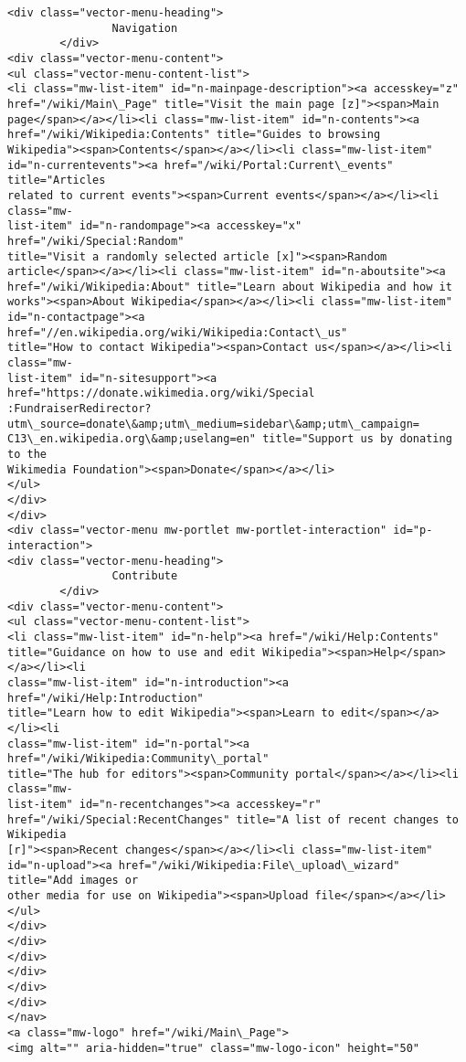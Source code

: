 \documentclass[11pt]{article}
\begin{document}
\begin{Verbatim}[commandchars=\\\{\}]
<div class="vector-menu-heading">
                Navigation
        </div>
<div class="vector-menu-content">
<ul class="vector-menu-content-list">
<li class="mw-list-item" id="n-mainpage-description"><a accesskey="z"
href="/wiki/Main\_Page" title="Visit the main page [z]"><span>Main
page</span></a></li><li class="mw-list-item" id="n-contents"><a
href="/wiki/Wikipedia:Contents" title="Guides to browsing
Wikipedia"><span>Contents</span></a></li><li class="mw-list-item"
id="n-currentevents"><a href="/wiki/Portal:Current\_events" title="Articles
related to current events"><span>Current events</span></a></li><li class="mw-
list-item" id="n-randompage"><a accesskey="x" href="/wiki/Special:Random"
title="Visit a randomly selected article [x]"><span>Random
article</span></a></li><li class="mw-list-item" id="n-aboutsite"><a
href="/wiki/Wikipedia:About" title="Learn about Wikipedia and how it
works"><span>About Wikipedia</span></a></li><li class="mw-list-item"
id="n-contactpage"><a href="//en.wikipedia.org/wiki/Wikipedia:Contact\_us"
title="How to contact Wikipedia"><span>Contact us</span></a></li><li class="mw-
list-item" id="n-sitesupport"><a href="https://donate.wikimedia.org/wiki/Special
:FundraiserRedirector?utm\_source=donate\&amp;utm\_medium=sidebar\&amp;utm\_campaign=
C13\_en.wikipedia.org\&amp;uselang=en" title="Support us by donating to the
Wikimedia Foundation"><span>Donate</span></a></li>
</ul>
</div>
</div>
<div class="vector-menu mw-portlet mw-portlet-interaction" id="p-interaction">
<div class="vector-menu-heading">
                Contribute
        </div>
<div class="vector-menu-content">
<ul class="vector-menu-content-list">
<li class="mw-list-item" id="n-help"><a href="/wiki/Help:Contents"
title="Guidance on how to use and edit Wikipedia"><span>Help</span></a></li><li
class="mw-list-item" id="n-introduction"><a href="/wiki/Help:Introduction"
title="Learn how to edit Wikipedia"><span>Learn to edit</span></a></li><li
class="mw-list-item" id="n-portal"><a href="/wiki/Wikipedia:Community\_portal"
title="The hub for editors"><span>Community portal</span></a></li><li class="mw-
list-item" id="n-recentchanges"><a accesskey="r"
href="/wiki/Special:RecentChanges" title="A list of recent changes to Wikipedia
[r]"><span>Recent changes</span></a></li><li class="mw-list-item"
id="n-upload"><a href="/wiki/Wikipedia:File\_upload\_wizard" title="Add images or
other media for use on Wikipedia"><span>Upload file</span></a></li>
</ul>
</div>
</div>
</div>
</div>
</div>
</div>
</nav>
<a class="mw-logo" href="/wiki/Main\_Page">
<img alt="" aria-hidden="true" class="mw-logo-icon" height="50"

\end{Verbatim}
\end{document}
